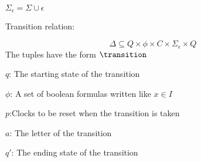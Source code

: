 $\Sigma_\epsilon=\Sigma\cup{\epsilon}$
\begin{definition}
    Transition relation:

    $$\Delta\subseteq Q\times\phi\times C\times\Sigma_\epsilon\times Q$$
The tuples have the form $\transition$

$q$: The starting state of the transition

$\phi$: A set of boolean formulas written like $x\in I$

$p$:Clocks to be reset when the transition is taken

$a$: The letter of the transition

$q'$: The ending state of the transition
\end{definition}\cite*{Eugene2001}